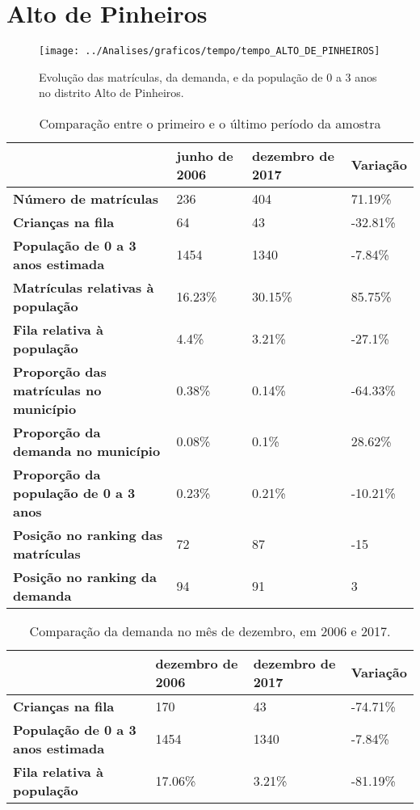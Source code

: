 \section{Alto de Pinheiros}
\begin{figure}[H]
\centering
\texttt{[image: ../Analises/graficos/tempo/tempo\_ALTO\_DE\_PINHEIROS]}
\caption{Evolução das matrículas, da demanda, e da população de 0 a 3 anos no distrito Alto de Pinheiros.}
\end{figure}
\begin{table}[H]
\begin{tabular}{|l|l|l|l|}
\hline
\textbf{}                                      & \textbf{junho de 2006}       & \textbf{dezembro de 2017}    & \textbf{Variação} \\ \hline
\textbf{Número de matrículas}                  & 236 & 404 & 71.19\% \\ \hline
\textbf{Crianças na fila}                      & 64 & 43 & -32.81\% \\ \hline
\textbf{População de 0 a 3 anos estimada}      & 1454 & 1340 & -7.84\% \\ \hline
\textbf{Matrículas relativas à população}      & 16.23\% & 30.15\% & 85.75\% \\ \hline
\textbf{Fila relativa à população}             & 4.4\% & 3.21\% & -27.1\% \\ \hline
\textbf{Proporção das matrículas no município} & 0.38\% & 0.14\% & -64.33\% \\ \hline
\textbf{Proporção da demanda no município}     & 0.08\% & 0.1\% & 28.62\% \\ \hline
\textbf{Proporção da população de 0 a 3 anos}  & 0.23\% & 0.21\% & -10.21\% \\ \hline
\textbf{Posição no ranking das matrículas}     & 72 & 87 & -15 \\ \hline
\textbf{Posição no ranking da demanda}         & 94 & 91 & 3 \\ \hline
\end{tabular}
\caption{Comparação entre o primeiro e o último período da amostra}
\end{table}
\begin{table}[H]
\begin{tabular}{|l|l|l|l|}
\hline
\textbf{}                                 & \textbf{dezembro de 2006} & \textbf{dezembro de 2017} & \textbf{Variação} \\ \hline
\textbf{Crianças na fila}                      & 170 & 43 & -74.71\% \\ \hline
\textbf{População de 0 a 3 anos estimada}      & 1454 & 1340 & -7.84\% \\ \hline
\textbf{Fila relativa à população}             & 17.06\% & 3.21\% & -81.19\% \\ \hline
\end{tabular}
\caption{Comparação da demanda no mês de dezembro, em 2006 e 2017.}
\end{table}
